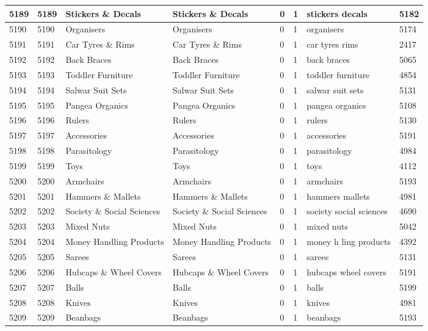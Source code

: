 \begin{longtable}{|l|l|l|l|l|l|l|l|}
5189 & 5189 & Stickers \& Decals & Stickers \& Decals & 0 & 1 & stickers decals & 5182 \\ \hline 
5190 & 5190 & Organisers & Organisers & 0 & 1 & organisers & 5174 \\ \hline 
5191 & 5191 & Car Tyres \& Rims & Car Tyres \& Rims & 0 & 1 & car tyres rims & 2417 \\ \hline 
5192 & 5192 & Back Braces & Back Braces & 0 & 1 & back braces & 5065 \\ \hline 
5193 & 5193 & Toddler Furniture & Toddler Furniture & 0 & 1 & toddler furniture & 4854 \\ \hline 
5194 & 5194 & Salwar Suit Sets & Salwar Suit Sets & 0 & 1 & salwar suit sets & 5131 \\ \hline 
5195 & 5195 & Pangea Organics & Pangea Organics & 0 & 1 & pangea organics & 5108 \\ \hline 
5196 & 5196 & Rulers & Rulers & 0 & 1 & rulers & 5130 \\ \hline 
5197 & 5197 & Accessories & Accessories & 0 & 1 & accessories & 5191 \\ \hline 
5198 & 5198 & Parasitology & Parasitology & 0 & 1 & parasitology & 4984 \\ \hline 
5199 & 5199 & Toys & Toys & 0 & 1 & toys & 4112 \\ \hline 
5200 & 5200 & Armchairs & Armchairs & 0 & 1 & armchairs & 5193 \\ \hline 
5201 & 5201 & Hammers \& Mallets & Hammers \& Mallets & 0 & 1 & hammers mallets & 4981 \\ \hline 
5202 & 5202 & Society \& Social Sciences & Society \& Social Sciences & 0 & 1 & society social sciences & 4690 \\ \hline 
5203 & 5203 & Mixed Nuts & Mixed Nuts & 0 & 1 & mixed nuts & 5042 \\ \hline 
5204 & 5204 & Money Handling Products & Money Handling Products & 0 & 1 & money h ling products & 4392 \\ \hline 
5205 & 5205 & Sarees & Sarees & 0 & 1 & sarees & 5131 \\ \hline 
5206 & 5206 & Hubcaps \& Wheel Covers & Hubcaps \& Wheel Covers & 0 & 1 & hubcaps wheel covers & 5191 \\ \hline 
5207 & 5207 & Balls & Balls & 0 & 1 & balls & 5199 \\ \hline 
5208 & 5208 & Knives & Knives & 0 & 1 & knives & 4981 \\ \hline 
5209 & 5209 & Beanbags & Beanbags & 0 & 1 & beanbags & 5193 \\ \hline 

\end{longtable}
